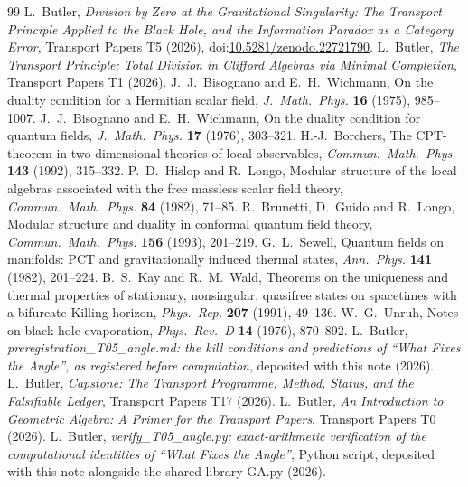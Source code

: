 \documentclass[11pt]{article}
\theoremstyle{definition}
\theoremstyle{plain}
\begin{document}
\begin{thebibliography}{99}
 L.~Butler,
\emph{Division by Zero at the Gravitational Singularity: The Transport Principle Applied to the Black Hole, and the Information Paradox as a Category Error},
Transport Papers T5 (2026), doi:\href{https://doi.org/10.5281/zenodo.22721790}{10.5281/zenodo.22721790}.
 L.~Butler,
\emph{The Transport Principle: Total Division in Clifford Algebras via Minimal Completion},
Transport Papers T1 (2026).
 J.~J.~Bisognano and E.~H.~Wichmann,
On the duality condition for a Hermitian scalar field,
\emph{J.\ Math.\ Phys.} \textbf{16} (1975), 985--1007.
 J.~J.~Bisognano and E.~H.~Wichmann,
On the duality condition for quantum fields,
\emph{J.\ Math.\ Phys.} \textbf{17} (1976), 303--321.
 H.-J.~Borchers,
The CPT-theorem in two-dimensional theories of local observables,
\emph{Commun.\ Math.\ Phys.} \textbf{143} (1992), 315--332.
 P.~D.~Hislop and R.~Longo,
Modular structure of the local algebras associated with the free massless scalar field theory,
\emph{Commun.\ Math.\ Phys.} \textbf{84} (1982), 71--85.
 R.~Brunetti, D.~Guido and R.~Longo,
Modular structure and duality in conformal quantum field theory,
\emph{Commun.\ Math.\ Phys.} \textbf{156} (1993), 201--219.
 G.~L.~Sewell,
Quantum fields on manifolds: PCT and gravitationally induced thermal states,
\emph{Ann.\ Phys.} \textbf{141} (1982), 201--224.
 B.~S.~Kay and R.~M.~Wald,
Theorems on the uniqueness and thermal properties of stationary, nonsingular, quasifree states on spacetimes with a bifurcate Killing horizon,
\emph{Phys.\ Rep.} \textbf{207} (1991), 49--136.
 W.~G.~Unruh,
Notes on black-hole evaporation,
\emph{Phys.\ Rev.\ D} \textbf{14} (1976), 870--892.
 L.~Butler,
\emph{preregistration\_T05\_angle.md: the kill conditions and predictions of ``What Fixes the Angle'', as registered before computation},
deposited with this note (2026).
 L.~Butler,
\emph{Capstone: The Transport Programme, Method, Status, and the Falsifiable Ledger},
Transport Papers T17 (2026).
 L.~Butler,
\emph{An Introduction to Geometric Algebra: A Primer for the Transport Papers},
Transport Papers T0 (2026).
 L.~Butler,
\emph{verify\_T05\_angle.py: exact-arithmetic verification of the computational identities of ``What Fixes the Angle''},
Python script, deposited with this note alongside the shared library GA.py (2026).
\end{thebibliography}
\end{document}
